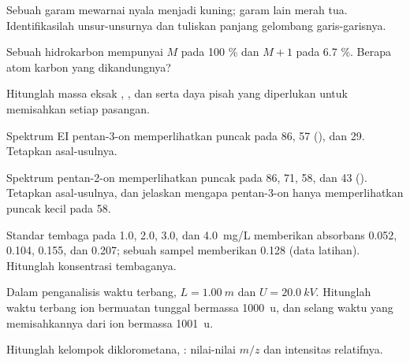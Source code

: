 \begin{exercise}[$\star$]\label{exo:b2:mass-spec-atomic:4}
Sebuah garam mewarnai nyala menjadi kuning; garam lain merah tua.
Identifikasilah unsur-unsurnya dan tuliskan panjang gelombang
garis-garisnya.
\end{exercise}

\begin{exercise}[$\star\star$]\label{exo:b2:mass-spec-atomic:5}
Sebuah hidrokarbon mempunyai $M$ pada 100 \% dan $M+1$ pada 6.7 \%. Berapa atom karbon yang dikandungnya?
\end{exercise}

\begin{exercise}[$\star\star$]\label{exo:b2:mass-spec-atomic:6}
Hitunglah massa eksak , , dan  serta daya pisah yang
diperlukan untuk memisahkan setiap pasangan.
\end{exercise}

\begin{exercise}[$\star\star$]\label{exo:b2:mass-spec-atomic:7}
Spektrum EI pentan-3-on memperlihatkan puncak pada 86, 57 (), dan 29. Tetapkan asal-usulnya.
\end{exercise}

\begin{exercise}[$\star\star$]\label{exo:b2:mass-spec-atomic:8}
Spektrum pentan-2-on memperlihatkan puncak pada 86, 71, 58, dan 43 (). Tetapkan asal-usulnya, dan jelaskan mengapa pentan-3-on hanya
memperlihatkan puncak kecil pada 58.
\end{exercise}

\begin{exercise}[$\star\star$]\label{exo:b2:mass-spec-atomic:9}
Standar tembaga pada 1.0, 2.0, 3.0, dan \qty{4.0}{mg/L} memberikan absorbans
0.052, 0.104, 0.155, dan 0.207; sebuah sampel memberikan 0.128 (data latihan).
Hitunglah konsentrasi tembaganya.
\end{exercise}

\begin{exercise}[$\star\star\star$]\label{exo:b2:mass-spec-atomic:10}
Dalam penganalisis waktu terbang, $L = \qty{1.00}{m}$ dan $U = \qty{20.0}{kV}$.
Hitunglah waktu terbang ion bermuatan tunggal bermassa \qty{1000}{u}, dan
selang waktu yang memisahkannya dari ion bermassa \qty{1001}{u}.
\end{exercise}

\begin{exercise}[$\star\star\star$]\label{exo:b2:mass-spec-atomic:11}
Hitunglah kelompok  diklorometana, : nilai-nilai $m/z$
dan intensitas relatifnya.
\end{exercise}

